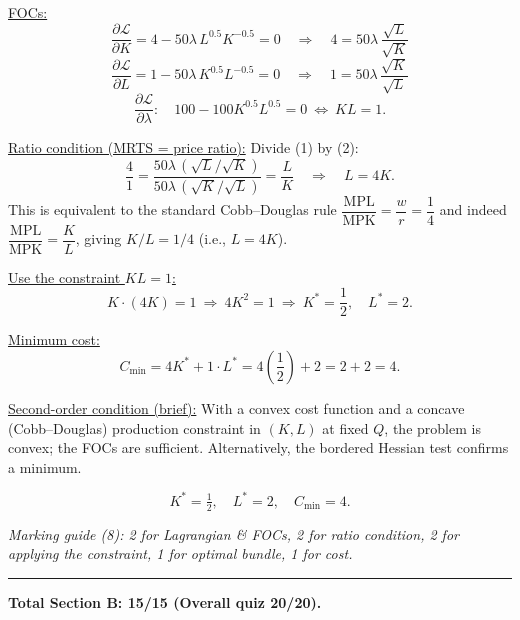 \documentclass[12pt]{article}
\begin{document}
\underline{FOCs:}
\[
\frac{\partial \mathcal{L}}{\partial K} = 4 - 50\lambda\,L^{0.5}K^{-0.5}=0
\quad\Rightarrow\quad 4 = 50\lambda\,\frac{\sqrt{L}}{\sqrt{K}} \tag{1}
\]
\[
\frac{\partial \mathcal{L}}{\partial L} = 1 - 50\lambda\,K^{0.5}L^{-0.5}=0
\quad\Rightarrow\quad 1 = 50\lambda\,\frac{\sqrt{K}}{\sqrt{L}} \tag{2}
\]
\[
\frac{\partial \mathcal{L}}{\partial \lambda}:\quad 100 - 100K^{0.5}L^{0.5}=0 \ \Longleftrightarrow\ KL=1. \tag{3}
\]

\underline{Ratio condition (MRTS = price ratio):} Divide (1) by (2):
\[
\frac{4}{1} = 
\frac{50\lambda\,(\sqrt{L}/\sqrt{K})}{50\lambda\,(\sqrt{K}/\sqrt{L})}
= \frac{L}{K}
\quad\Longrightarrow\quad L=4K.
\]
This is equivalent to the standard Cobb–Douglas rule
$\dfrac{\text{MPL}}{\text{MPK}}=\dfrac{w}{r}=\dfrac{1}{4}$ and indeed 
$\dfrac{\text{MPL}}{\text{MPK}}=\dfrac{K}{L}$, giving $K/L=1/4$ (i.e., $L=4K$).

\underline{Use the constraint $KL=1$:}
\[
K\cdot(4K)=1 \ \Rightarrow\ 4K^2=1 \ \Rightarrow\ K^*=\frac{1}{2},\quad L^*=2.
\]

\underline{Minimum cost:}
\[
C_{\min}=4K^*+1\cdot L^* = 4\left(\frac{1}{2}\right)+2 = 2+2 = \boxed{4}.
\]

\underline{Second-order condition (brief):} With a convex cost function and a concave (Cobb–Douglas) production constraint in $(K,L)$ at fixed $Q$, the problem is convex; the FOCs are sufficient. Alternatively, the bordered Hessian test confirms a minimum.

\[
\boxed{K^*=\tfrac{1}{2},\quad L^*=2,\quad C_{\min}=4.}
\]

\medskip
\noindent\textit{Marking guide (8): 2 for Lagrangian \& FOCs, 2 for ratio condition, 2 for applying the constraint, 1 for optimal bundle, 1 for cost.}



\vspace{0.5em}
\hrule
\vspace{0.5em}

\noindent\textbf{Total Section B: 15/15 \quad (Overall quiz 20/20).}
\end{document}
